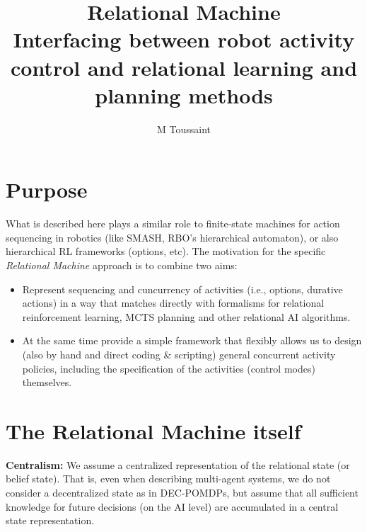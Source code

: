 \documentclass[10pt,fleqn,twoside]{article}
\title{Relational Machine\\Interfacing between robot activity control
  and relational learning and planning methods}
\author{M Toussaint}
\begin{document}
\maketitle

\section{Purpose}

What is described here plays a similar role to finite-state machines
for action sequencing in robotics (like SMASH, RBO's hierarchical
automaton), or also hierarchical RL frameworks (options, etc). The
motivation for the specific \emph{Relational Machine} approach is to
combine two aims:
\begin{itemize}
\item Represent sequencing and cuncurrency of activities (i.e., options,
  durative actions) in a way that matches directly with formalisms
  for relational reinforcement learning, MCTS planning and other
  relational AI algorithms.
\item At the same time provide a simple framework that flexibly allows
  us to design (also by hand and direct coding \& scripting) general
  concurrent activity policies, including the specification of the
  activities (control modes) themselves.
\end{itemize}

\section{The Relational Machine itself}

\textbf{Centralism:} We assume a centralized representation of the
relational state (or belief state). That is, even when describing
multi-agent systems, we do not consider a decentralized state as in
DEC-POMDPs, but assume that all sufficient knowledge for future
decisions (on the AI level) are accumulated in a central state
representation.
\end{document}
